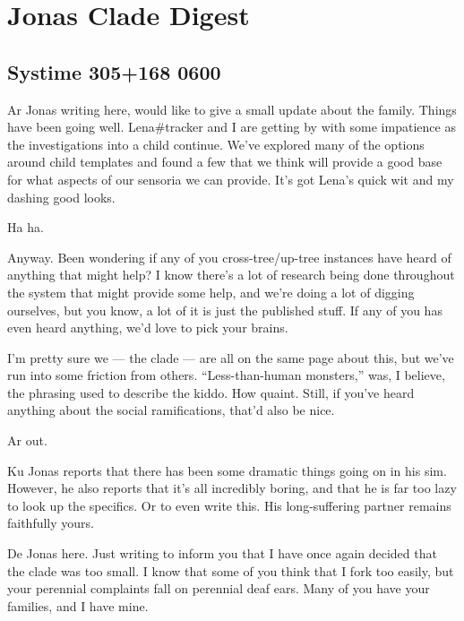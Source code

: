 \hypertarget{jonas-clade-digest}{%
\section*{Jonas Clade Digest}\label{jonas-clade-digest}}

\hypertarget{systime-305168-0600}{%
\subsection*{Systime 305+168 0600}\label{systime-305168-0600}}

Ar Jonas writing here, would like to give a small update about the family. Things have been going well. Lena\#tracker and I are getting by with some impatience as the investigations into a child continue. We've explored many of the options around child templates and found a few that we think will provide a good base for what aspects of our sensoria we can provide. It's got Lena's quick wit and my dashing good looks.

Ha ha.

Anyway. Been wondering if any of you cross-tree/up-tree instances have heard of anything that might help? I know there's a lot of research being done throughout the system that might provide some help, and we're doing a lot of digging ourselves, but you know, a lot of it is just the published stuff. If any of you has even heard anything, we'd love to pick your brains.

I'm pretty sure we --- the clade --- are all on the same page about this, but we've run into some friction from others. ``Less-than-human monsters,'' was, I believe, the phrasing used to describe the kiddo. How quaint. Still, if you've heard anything about the social ramifications, that'd also be nice.

Ar out.

\secdiv{}

\noindent Ku Jonas reports that there has been some dramatic things going on in his sim. However, he also reports that it's all incredibly boring, and that he is far too lazy to look up the specifics. Or to even write this. His long-suffering partner remains faithfully yours.

\secdiv{}

\noindent De Jonas here. Just writing to inform you that I have once again decided that the clade was too small. I know that some of you think that I fork too easily, but your perennial complaints fall on perennial deaf ears. Many of you have your families, and I have mine.

